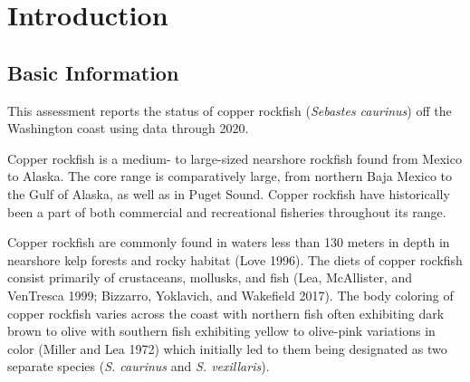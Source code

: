 \documentclass[11pt,
  english,
  a4paper,
]{article}
\begin{document}
\setlength\parskip{0.5em plus 0.1em minus 0.2em}


\hypertarget{introduction}{%
\section{Introduction}\label{introduction}}

\leavevmode\tagmcend\tagstructend


\hypertarget{basic-information}{%
\subsection{Basic Information}\label{basic-information}}

\leavevmode\tagmcend\tagstructend


This assessment reports the status of copper rockfish (\emph{Sebastes caurinus}) off the Washington coast using data through 2020.

\leavevmode\tagmcend\tagstructend\par


Copper rockfish is a medium- to large-sized nearshore rockfish found from Mexico to Alaska. The core range is comparatively large, from northern Baja Mexico to the Gulf of Alaska, as well as in Puget Sound. Copper rockfish have historically been a part of both commercial and recreational fisheries throughout its range.

\leavevmode\tagmcend\tagstructend\par


Copper rockfish are commonly found in waters less than 130 meters in depth in nearshore kelp forests and rocky habitat {(Love 1996)\leavevmode\tagmcend\tagstructend}. The diets of copper rockfish consist primarily of crustaceans, mollusks, and fish {(Lea, McAllister, and VenTresca 1999; Bizzarro, Yoklavich, and Wakefield 2017)\leavevmode\tagmcend\tagstructend}. The body coloring of copper rockfish varies across the coast with northern fish often exhibiting dark brown to olive with southern fish exhibiting yellow to olive-pink variations in color {(Miller and Lea 1972)\leavevmode\tagmcend\tagstructend} which initially led to them being designated as two separate species (\emph{S. caurinus} and \emph{S. vexillaris}).
\end{document}
